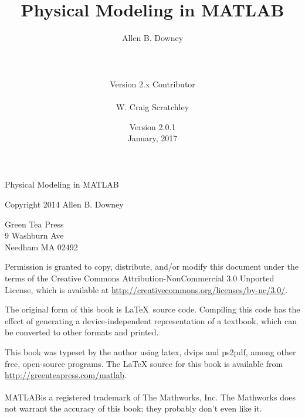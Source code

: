 \documentclass{book}
\newcommand{\myreg}{\textsuperscript{{\tiny \textregistered}}}
\begin{document}
\frontmatter


\newcommand{\thetitle}{Physical Modeling in MATLAB\myreg}
\newcommand{\theversion}{2.0.1}
\title {\thetitle}
\author {Allen B. Downey \\\\\\\\
Version 2.x Contributor\\\\
W. Craig Scratchley\\}
\date {Version \theversion \\
January, 2017
}





\begin{latexonly}



\maketitle

\vspace{2in}

\begin{center}
{\Large \thetitle}

\vspace{0.25in}

Copyright 2014 Allen B. Downey
\end{center}

\vspace{0.25in}

\begin{flushleft}
Green Tea Press       \\
9 Washburn Ave \\
Needham MA 02492
\end{flushleft}

Permission is granted to copy, distribute, and/or modify this document
under the terms of the Creative Commons Attribution-NonCommercial 3.0 Unported
License, which is available at \url{http://creativecommons.org/licenses/by-nc/3.0/}.

The original form of this book is \LaTeX\ source code.  Compiling this
code has the effect of generating a device-independent representation
of a textbook, which can be converted to other formats and printed.

This book was typeset by the author using latex, dvips and ps2pdf,
among other free, open-source programs.
The LaTeX source for this book is available from
\url{http://greenteapress.com/matlab}.

MATLAB\myreg is a registered trademark of The
Mathworks, Inc.  The Mathworks does not warrant the accuracy
of this book; they probably don't even like it.

\end{latexonly}
\end{document}
